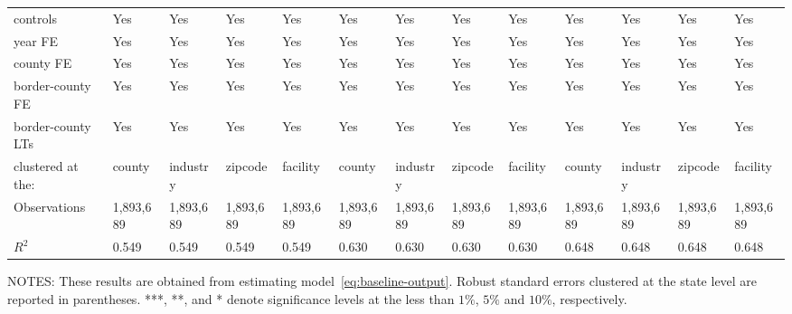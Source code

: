 \begin{table}[H]
{\begin{tabular}{@{}lllllllllllll@{}}
            controls                                                   & Yes       & Yes       & Yes       & Yes       & Yes       & Yes       & Yes       & Yes       & Yes       & Yes       & Yes       & Yes       \\
            year FE                                                    & Yes       & Yes       & Yes       & Yes       & Yes       & Yes       & Yes       & Yes       & Yes       & Yes       & Yes       & Yes       \\
            county FE                                                  & Yes       & Yes       & Yes       & Yes       & Yes       & Yes       & Yes       & Yes       & Yes       & Yes       & Yes       & Yes       \\
            border-county FE                                           & Yes       & Yes       & Yes       & Yes       & Yes       & Yes       & Yes       & Yes       & Yes       & Yes       & Yes       & Yes       \\
            border-county LTs                                          & Yes       & Yes       & Yes       & Yes       & Yes       & Yes       & Yes       & Yes       & Yes       & Yes       & Yes       & Yes       \\
            clustered at the:                                          & county    & industry  & zipcode   & facility  & county    & industry  & zipcode   & facility  & county    & industry  & zipcode   & facility  \\
            Observations                                               & 1,893,689 & 1,893,689 & 1,893,689 & 1,893,689 & 1,893,689 & 1,893,689 & 1,893,689 & 1,893,689 & 1,893,689 & 1,893,689 & 1,893,689 & 1,893,689 \\
            $R^2$                                                      & 0.549     & 0.549     & 0.549     & 0.549     & 0.630     & 0.630     & 0.630     & 0.630     & 0.648     & 0.648     & 0.648     & 0.648     \\ \bottomrule\bottomrule
        \end{tabular}%
    }
    \begin{minipage}{\columnwidth}
        \vspace{0.05in}
        \tiny NOTES: These results are obtained from estimating model~\ref{eq:baseline-output}. Robust standard errors clustered at the state level are reported in parentheses. ***, **, and * denote significance levels at the less than $1\%$, $5\%$ and $10\%$, respectively.
    \end{minipage}
\end{table}